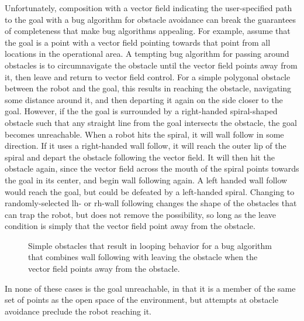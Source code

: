 Unfortunately, composition with a vector field indicating the user-specified path to the goal with a bug algorithm for obstacle avoidance can break the guarantees of completeness that make bug algorithms appealing. 
For example, assume that the goal is a point with a vector field pointing towards that point from all locations in the operational area. 
A tempting bug algorithm for passing around obstacles is to circumnavigate the obstacle until the vector field points away from it, then leave and return to vector field control. 
For a simple polygonal obstacle between the robot and the goal, this results in reaching the obstacle, navigating some distance around it, and then departing it again on the side closer to the goal. 
However, if the the goal is surrounded by a right-handed spiral-shaped obstacle such that any straight line from the goal intersects the obstacle, the goal becomes unreachable. 
When a robot hits the spiral, it will wall follow in some direction.
If it uses a right-handed wall follow, it will reach the outer lip of the spiral and depart the obstacle following the vector field. It will then hit the obstacle again, since the vector field across the mouth of the spiral points towards the goal in its center, and begin wall following again. 
A left handed wall follow would reach the goal, but could be defeated by a left-handed spiral. 
Changing to randomly-selected lh- or rh-wall following changes the shape of the obstacles that can trap the robot, but does not remove the possibility, so long as the leave condition is simply that the vector field point away from the obstacle. 

\begin{figure}
	\centering
	\begin{subfigure}{0.45\textwidth}
	\end{subfigure}
	\begin{subfigure}{0.45\textwidth}
	\end{subfigure}
	\caption{Simple obstacles that result in looping behavior for a bug algorithm that combines wall following with leaving the obstacle when the vector field points away from the obstacle.}
	\label{traps_for_wall_follow}
\end{figure}

In none of these cases is the goal unreachable, in that it is a member of the same set of points as the open space of the environment, but attempts at obstacle avoidance preclude the robot reaching it. 

